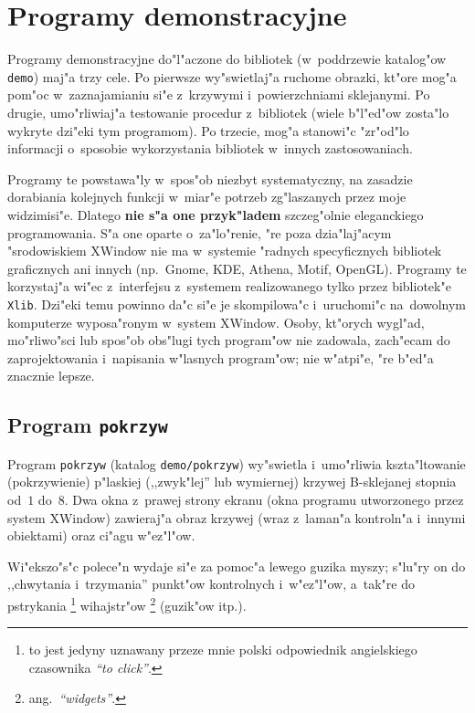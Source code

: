 

\chapter{Programy demonstracyjne}

Programy demonstracyjne do"l"aczone do bibliotek (w~poddrzewie katalog"ow
\texttt{demo}) maj"a trzy cele. Po pierwsze wy"swietlaj"a ruchome obrazki,
kt"ore mog"a pom"oc w~zaznajamianiu si"e z~krzywymi i~powierzchniami
sklejanymi. Po drugie, umo"rliwiaj"a testowanie procedur z~bibliotek (wiele
b"l"ed"ow zosta"lo wykryte dzi"eki tym programom).
Po trzecie, mog"a stanowi"c "zr"od"lo informacji o~sposobie wykorzystania
bibliotek w~innych zastosowaniach.

Programy te powstawa"ly w~spos"ob niezbyt systematyczny, na zasadzie
dorabiania kolejnych funkcji w~miar"e potrzeb zg"laszanych przez moje
widzimisi"e. Dlatego \textbf{nie s"a one przyk"ladem} szczeg"olnie
eleganckiego programowania. S"a one oparte o~za"lo"renie, "re poza
dzia"laj"acym "srodowiskiem XWindow nie ma w~systemie "radnych
specyficznych bibliotek graficznych ani innych (np.\ Gnome, KDE,
Athena, Motif, OpenGL). Programy te korzystaj"a wi"ec z~interfejsu
z~systemem realizowanego tylko przez bibliotek"e \texttt{Xlib}.
Dzi"eki temu powinno da"c si"e je skompilowa"c i~uruchomi"c na~dowolnym
komputerze wyposa"ronym w~system XWindow. Osoby, kt"orych wygl"ad,
mo"rliwo"sci lub spos"ob obs"lugi tych program"ow nie zadowala,
zach"ecam do zaprojektowania i~napisania w"lasnych program"ow; nie
w"atpi"e, "re b"ed"a znacznie lepsze.


\section{Program \texttt{pokrzyw}}

Program \texttt{pokrzyw} (katalog \texttt{demo/pokrzyw})
wy"swietla i~umo"rliwia kszta"ltowanie (pokrzywienie) p"laskiej
(,,zwyk"lej'' lub wymiernej) krzywej B-sklejanej stopnia od~$1$ do~$8$.
Dwa okna z~prawej strony ekranu (okna programu utworzonego przez system
XWindow) zawieraj"a obraz krzywej (wraz z~laman"a kontroln"a i~innymi
obiektami) oraz ci"agu w"ez"l"ow.

Wi"ekszo"s"c polece"n wydaje si"e za pomoc"a lewego guzika myszy; s"lu"ry on
do ,,chwytania i~trzymania'' punkt"ow kontrolnych i~w"ez"l"ow, a~tak"re do
pstrykania%
\footnote{to jest jedyny uznawany przeze mnie polski odpowiednik
angielskiego czasownika \emph{``to click''}.}
wihajstr"ow%
\footnote{ang.~\emph{``widgets''}.}
(guzik"ow itp.).

